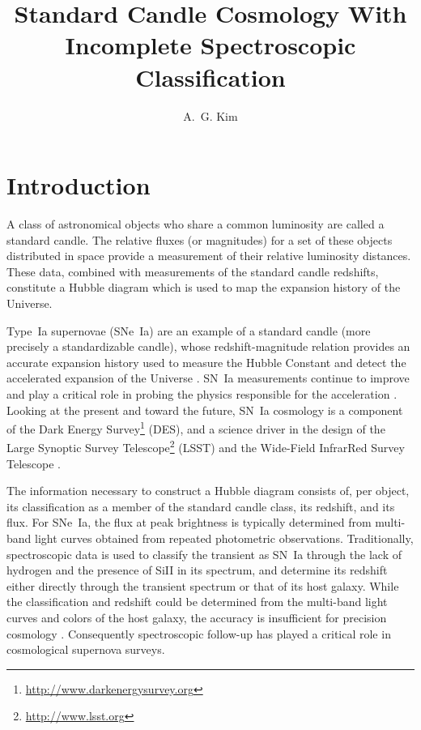 \documentclass[preprint,3p]{elsarticle}
\begin{document}
\begin{frontmatter}

\title{Standard Candle Cosmology With Incomplete Spectroscopic Classification}
\author{A.~G. Kim}
\address{Physics Division, Lawrence Berkeley National Laboratory, 1 Cyclotron Road, Berkeley CA, USA 94720}

\begin{abstract}
\end{abstract}
\begin{keyword}
\end{keyword}
\end{frontmatter}

\section{Introduction}
A class of astronomical objects who share a common luminosity are called a standard
candle.  The relative fluxes (or magnitudes) for a set of these objects distributed in space
provide a measurement of their relative luminosity distances. These data, combined with
measurements of the standard candle redshifts, constitute a Hubble
diagram which is used to map the expansion history of the Universe.

Type~Ia supernovae (SNe~Ia) are an example of a standard candle (more precisely a standardizable
candle), whose redshift-magnitude relation provides an accurate expansion history
used to measure the Hubble Constant
\citep{2001ApJ...553...47F} and detect the accelerated expansion of the Universe
\citep{1998AJ....116.1009R, 1999ApJ...517..565P}.  SN~Ia measurements continue
to improve 
\citep{2014A&A...568A..22B} and play a critical role in probing the physics
responsible for the acceleration \citep{2013PhR...530...87W}.
Looking at the present and toward the future, SN~Ia cosmology is
a component of the Dark Energy Survey\footnote{\url{http://www.darkenergysurvey.org}} (DES),
and a science driver in the design of the
Large Synoptic Survey Telescope\footnote{\url{http://www.lsst.org}} (LSST)
and the Wide-Field InfrarRed Survey Telescope
\citep{2015arXiv150303757S}.

The information necessary to construct a Hubble diagram consists of, per object,
its classification as a
member of the standard candle class, its redshift, and its flux.  For SNe~Ia, the flux at
peak brightness is typically determined from multi-band light curves obtained from repeated
photometric observations. Traditionally, spectroscopic data is used to classify the transient
as SN~Ia through the lack of hydrogen and the presence of SiII in its spectrum,
and determine its redshift either directly through the transient spectrum or that of its host
galaxy. While the classification and redshift could be determined from the multi-band
light curves and colors of the host galaxy, the accuracy is insufficient for precision
cosmology \citep{2011ApJ...738..162S}.  Consequently spectroscopic follow-up
has played a critical role in cosmological supernova surveys.
\end{document}
